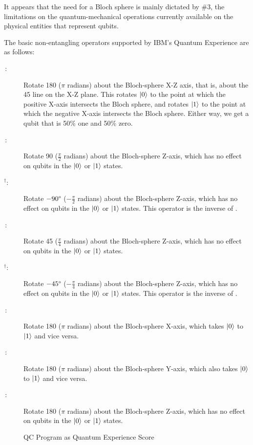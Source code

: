 It appears that the need for a Bloch sphere is mainly dictated by \#3,
the limitations on the quantum-mechanical operations currently available
on the physical entities that represent qubits.

The basic non-entangling operators supported by IBM's Quantum Experience
are as follows:

\begin{description}
\item[\,:]
	Rotate 180\degree{} ($\pi$ radians) about the Bloch-sphere
	X-Z axis, that is, about the 45\degree{} line on the
	X-Z plane.  This rotates $\ket{0}$ to the point at which the
	positive X-axis intersects the Bloch sphere, and rotates $\ket{1}$
	to the point at which the negative X-axis intersects the Bloch
	sphere.
	Either way, we get a qubit that is 50\% one and 50\% zero.
\item[\,:]
	Rotate 90\degree{} ($\frac{\pi}{2}$ radians) about the
	Bloch-sphere Z-axis, which has no effect on qubits in the
	$\ket{0}$ or $\ket{1}$ states.
\item[$^{\bm{\dagger}}$:]
	Rotate $-90\degree$ ($-\frac{\pi}{2}$ radians) about the
	Bloch-sphere Z-axis, which has no effect on qubits in the
	$\ket{0}$ or $\ket{1}$ states.
	This operator is the inverse of .
\item[\,:]
	Rotate 45\degree{} ($\frac{\pi}{4}$ radians) about the
	Bloch-sphere Z-axis, which has no effect on qubits in the
	$\ket{0}$ or $\ket{1}$ states.
\item[$^{\bm{\dagger}}$:]
	Rotate $-45\degree$ ($-\frac{\pi}{4}$ radians) about the
	Bloch-sphere Z-axis, which has no effect on qubits in the
	$\ket{0}$ or $\ket{1}$ states.
	This operator is the inverse of .
\item[\,:]
	Rotate 180\degree{} ($\pi$ radians) about the Bloch-sphere
	X-axis, which takes $\ket{0}$ to $\ket{1}$ and vice versa.
\item[\,:]
	Rotate 180\degree{} ($\pi$ radians) about the Bloch-sphere
	Y-axis, which also takes $\ket{0}$ to $\ket{1}$ and vice versa.
\item[\,:]
	Rotate 180\degree{} ($\pi$ radians) about the Bloch-sphere
	Z-axis, which has no effect on qubits in the $\ket{0}$ or
	$\ket{1}$ states.
\end{description}

\begin{figure}[tb]
\centering
{}
\caption{QC Program as Quantum Experience Score}
\label{fig:future:QC Program as Quantum Experience Score}
\end{figure}

